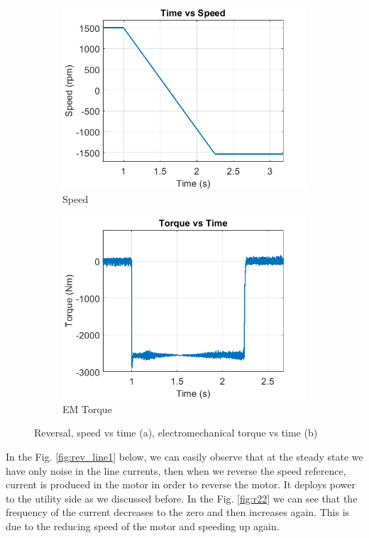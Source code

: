 \begin{figure}[H]
        \centering
        \begin{subfigure}[b]{0.475\textwidth}
            \centering
            \includegraphics[width = 8 cm]{figs/reverse_speed.png}
            \caption{Speed }
            \label{fig:r_s}
        \end{subfigure}
        \hfill
        \begin{subfigure}[b]{0.475\textwidth}  
            \centering 
            \includegraphics[width = 8 cm]{figs/reverse_torque.png}
            \caption{EM Torque}
            \label{fig:r_t}
        \end{subfigure}
        \caption{Reversal, speed vs time (a), electromechanical torque vs time (b)}
        \label{fig:rev1}
        \end{figure}

In the Fig. \ref{fig:rev_line1} below, we can easily observe that at the steady state we have only noise in the line currents, then when we reverse the speed reference, current is produced in the motor in order to reverse the motor. It deploys power to the utility side as we discussed before. In the Fig. \ref{fig:r22} we can see that the frequency of the current decreases to the zero and then increases again. This is due to the reducing speed of the motor and speeding up again.       
        
